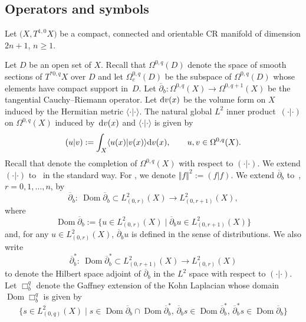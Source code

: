 \documentclass[pdftex]{sigma}
\numberwithin{equation}{section}
\newcommand{\ddbar}{\overline\partial}
\newcommand{\pr}{\partial}
\newcommand{\ol}{\overline}
\newcommand{\norm}[1]{\left\Vert#1\right\Vert}
\newcommand{\To}{\rightarrow}
\begin{document}
	 \subsection{Operators and symbols} \label{sec:crmanif}
	
	 Let $\bigl(X, T^{1,0}X\bigr)$ be a compact, connected and orientable CR manifold of dimension $2n+1$, $n\geq 1$.
	
	 Let $D$ be an open set of $X$. Recall that $\Omega^{0,q}(D)$ denote the space of smooth sections of $T^{*0,q}X$ over $D$ and let $\Omega^{0,q}_c(D)$ be the subspace of $\Omega^{0,q}(D)$ whose elements have compact support in~$D$. Let
$
	 \ddbar_b\colon\Omega^{0,q}(X)\To\Omega^{0,q+1}(X)
$
	 be the tangential Cauchy--Riemann operator. Let ${\rm d}v(x)$ be the volume form on $X$ induced by the Hermitian metric $\langle \cdot | \cdot \rangle$.
	 The natural global $L^2$ inner product~$( \cdot | \cdot )$ on $\Omega^{0,q}(X)$
	 induced by~${\rm d}v(x)$ and $\langle \cdot | \cdot \rangle$ is given by
	 \[
	 ( u | v ):=\int_X\langle u(x) | v(x) \rangle {\rm d}v(x) ,\qquad u,v\in\Omega^{0,q}(X) .
	 \]
	 Recall that  denote
	 the completion of $\Omega^{0,q}(X)$ with respect to $( \cdot | \cdot )$.
	 We extend $( \cdot | \cdot )$ to~
	 in the standard way. For , we denote $\norm{f}^2:=( f | f )$.
	 We extend
	 $\ddbar_{b}$ to~, $r=0,1,\dots,n$, by
	 \[
	 \ddbar_{b}\colon \ \operatorname{Dom}\ddbar_{b}\subset L^2_{(0,r)}(X)\To L^2_{(0,r+1)}(X) ,
	 \]
	 where \[\operatorname{Dom}\ddbar_{b}:=\big\{u\in L^2_{(0,r)}(X)\mid \ddbar_{b}u\in L^2_{(0,r+1)}(X)\big\}\] and, for any $u\in L^2_{(0,r)}(X)$, $\ddbar_{b} u$ is defined in the sense of distributions.
	 We also write
	 \[
	 \ol{\pr}^{*}_{b}\colon \ \operatorname{Dom}\ol{\pr}^{*}_{b}\subset L^2_{(0,r+1)}(X)\To L^2_{(0,r)}(X)
	 \]
	 to denote the Hilbert space adjoint of $\ddbar_{b}$ in the $L^2$ space with respect to $( \cdot | \cdot )$.
	 Let $\Box^{q}_{b}$ denote the Gaffney extension of the Kohn Laplacian whose domain $\operatorname{Dom}\Box^q_{b}$ is given by
	 \begin{equation*}
	 		\big\{s\in L^2_{(0,q)}(X)\mid
	 		s\in\operatorname{Dom}\ddbar_{b}\cap\operatorname{Dom}\ol{\pr}^{*}_{b},\,
	 		\ddbar_{b}s\in\operatorname{Dom}\ol{\pr}^{*}_{b}, \, \ol{\pr}^{*}_{b}s\in\operatorname{Dom}\ddbar_{b}\big\}
	 \end{equation*}
\end{document}
